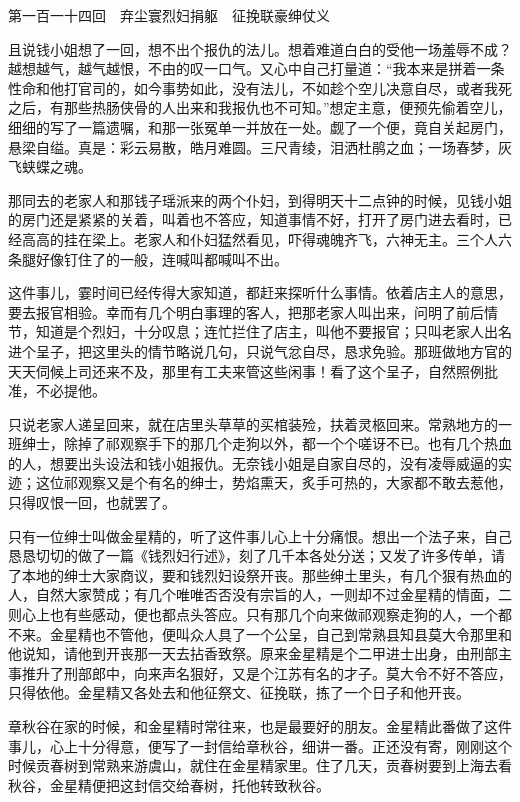 \documentclass[12pt,UTF8]{ctexbook}
\begin{document}
{{{第一百一十四回　弃尘寰烈妇捐躯　征挽联豪绅仗义





且说钱小姐想了一回，想不出个报仇的法儿。想着难道白白的受他一场羞辱不成？越想越气，越气越恨，不由的叹一口气。又心中自己打量道：“我本来是拼着一条性命和他打官司的，如今事势如此，没有法儿，不如趁个空儿决意自尽，或者我死之后，有那些热肠侠骨的人出来和我报仇也不可知。”想定主意，便预先偷着空儿，细细的写了一篇遗嘱，和那一张冤单一并放在一处。觑了一个便，竟自关起房门，悬梁自缢。真是：彩云易散，皓月难圆。三尺青绫，泪洒杜鹃之血；一场春梦，灰飞蛱蝶之魂。

那同去的老家人和那钱子瑶派来的两个仆妇，到得明天十二点钟的时候，见钱小姐的房门还是紧紧的关着，叫着也不答应，知道事情不好，打开了房门进去看时，已经高高的挂在梁上。老家人和仆妇猛然看见，吓得魂魄齐飞，六神无主。三个人六条腿好像钉住了的一般，连喊叫都喊叫不出。

这件事儿，霎时间已经传得大家知道，都赶来探听什么事情。依着店主人的意思，要去报官相验。幸而有几个明白事理的客人，把那老家人叫出来，问明了前后情节，知道是个烈妇，十分叹息；连忙拦住了店主，叫他不要报官；只叫老家人出名进个呈子，把这里头的情节略说几句，只说气忿自尽，恳求免验。那班做地方官的天天伺候上司还来不及，那里有工夫来管这些闲事！看了这个呈子，自然照例批准，不必提他。

只说老家人递呈回来，就在店里头草草的买棺装殓，扶着灵柩回来。常熟地方的一班绅士，除掉了祁观察手下的那几个走狗以外，都一个个嗟讶不已。也有几个热血的人，想要出头设法和钱小姐报仇。无奈钱小姐是自家自尽的，没有凌辱威逼的实迹；这位祁观察又是个有名的绅士，势焰熏天，炙手可热的，大家都不敢去惹他，只得叹恨一回，也就罢了。

只有一位绅士叫做金星精的，听了这件事儿心上十分痛恨。想出一个法子来，自己恳恳切切的做了一篇《钱烈妇行述》，刻了几千本各处分送；又发了许多传单，请了本地的绅士大家商议，要和钱烈妇设祭开丧。那些绅土里头，有几个狠有热血的人，自然大家赞成；有几个唯唯否否没有宗旨的人，一则却不过金星精的情面，二则心上也有些感动，便也都点头答应。只有那几个向来做祁观察走狗的人，一个都不来。金星精也不管他，便叫众人具了一个公呈，自己到常熟县知县莫大令那里和他说知，请他到开丧那一天去拈香致祭。原来金星精是个二甲进士出身，由刑部主事推升了刑部郎中，向来声名狠好，又是个江苏有名的才子。莫大令不好不答应，只得依他。金星精又各处去和他征祭文、征挽联，拣了一个日子和他开丧。

章秋谷在家的时候，和金星精时常往来，也是最要好的朋友。金星精此番做了这件事儿，心上十分得意，便写了一封信给章秋谷，细讲一番。正还没有寄，刚刚这个时候贡春树到常熟来游虞山，就住在金星精家里。住了几天，贡春树要到上海去看秋谷，金星精便把这封信交给春树，托他转致秋谷。

}}}
\end{document}
